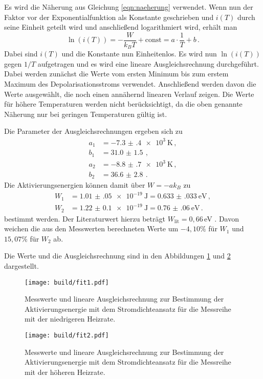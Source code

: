 Es wird die Näherung aus Gleichung \eqref{eqn:naeherung} verwendet. Wenn nun
der Faktor vor der Exponentialfunktion als Konstante geschrieben und $i(T)$ durch
seine Einheit geteilt wird und anschließend
logarithmiert wird, erhält man
\begin{equation*}
  \ln(i(T))=-\frac{W}{k_B T} + \text{const} =a\cdot \frac{1}{T} +b  \,.
\end{equation*}
Dabei sind $i(T)$ und die Konstante nun Einheitenlos.
\cite{Kann man das irgendwie schöner formulieren?}
Es wird nun $\ln(i(T))$ gegen $1/T$ aufgetragen und es wird eine lineare Ausgleichsrechnung
durchgeführt. Dabei werden zunächst die Werte vom ersten Minimum bis zum erstem Maximum
des Depolarisationsstroms verwendet. Anschließend werden davon die Werte ausgewählt, die
noch einen annähernd linearen Verlauf zeigen. Die Werte für höhere Temperaturen werden
nicht berücksichtigt, da die oben genannte Näherung nur bei geringen
Temperaturen gültig ist.

Die Parameter
der Ausgleichsrechnungen ergeben sich zu
\begin{align*}
  a_1&=\SI{-7.3(4)e+3}{\kelvin} \,, \\
  b_1&=\SI{31.0(15)}{}  \,, \\
  a_2&=\SI{-8.8(7)e+3}{\kelvin} \,, \\
  b_2&=\SI{36.6(28)}{}  \,.
\end{align*}
Die Aktivierungsenergien können damit über $W=-ak_B$ zu
\begin{align*}
 W_1&=\SI{1.01(05)e-19}{\joule}= \SI{0.633(033)}{\eV}  \,, \\
 W_2&=\SI{1.22(010)e-19}{\joule}=\SI{0.76(06)}{\eV} \,.
\end{align*}
bestimmt werden. Der Literaturwert hierzu beträgt $W_{\text{lit}}=0{,}66\,$eV \cite{lit}. Davon weichen
die aus den Messwerten berechneten Werte um $-4{,}10\%$ für $W_1$ und $15{,}07\%$ für
$W_2$ ab.

Die Werte und die Ausgleichsrechnung sind in den Abbildungen \ref{fig:fit1} und
\ref{fig:fit2} dargestellt.

\begin{figure}
  \centering
  \texttt{[image: build/fit1.pdf]}
  \caption{Messwerte und lineare Ausgleichsrechnung zur Bestimmung der Aktivierungsenergie mit dem Stromdichteansatz für
  die Messreihe mit der niedrigeren Heizrate.}
  \label{fig:fit1}
\end{figure}
\begin{figure}
  \centering
  \texttt{[image: build/fit2.pdf]}
  \caption{Messwerte und lineare Ausgleichsrechnung zur Bestimmung der Aktivierungsenergie mit dem Stromdichteansatz für
  die Messreihe mit der höheren Heizrate.}
  \label{fig:fit2}
\end{figure}

